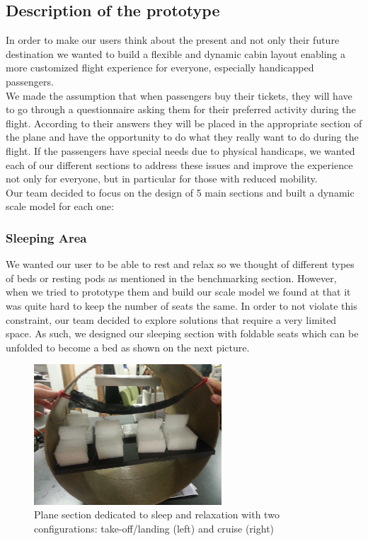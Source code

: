 \subsection{Description of the prototype}
In order to make our users think about the present and not only their future destination we wanted to build a flexible and dynamic cabin layout enabling a more customized flight experience for everyone, especially handicapped passengers. \\

We made the assumption that when passengers buy their tickets, they will have to go through a questionnaire asking them for their preferred activity during the flight. According to their answers they will be placed in the appropriate section of the plane and have the opportunity to do what they really want to do during the flight. If the passengers have special needs due to physical handicaps, we wanted each of our different sections to address these issues and improve the experience not only for everyone, but in particular for those with reduced mobility. \\

Our team decided to focus on the design of 5 main sections and built a dynamic scale model for each one:

\subsubsection{Sleeping Area}
We wanted our user to be able to rest and relax so we thought of different types of beds or resting pods as mentioned in the benchmarking section. However, when we tried to prototype them and build our scale model we found at that it was quite hard to keep the number of seats the same. In order to not violate this constraint, our team decided to explore solutions that require a very limited space. As such, we designed our sleeping section with foldable seats which can be unfolded to become a bed as shown on the next picture.

\begin{figure}[h]
  \centering
     \includegraphics[width=7cm]{images/20140116_172733.jpg}
   \caption{Plane section dedicated to sleep and relaxation with two configurations: take-off/landing (left) and cruise (right)}
  \label{fig:20140116_172733}
\end{figure}

